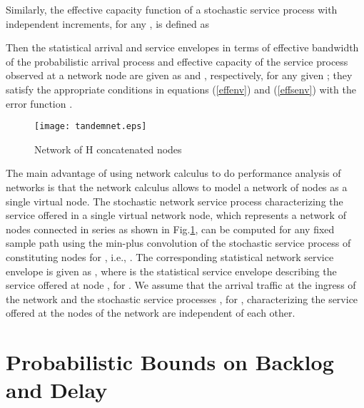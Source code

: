 \documentclass[letterpaper]{IEEEtran}
\begin{document}
Similarly, the effective capacity function of a stochastic service process  with independent increments, for any , is defined as
 
Then the statistical arrival and service envelopes in terms of effective bandwidth of the probabilistic arrival process and effective capacity of the service process observed at a network node are given as  and , respectively, for any given ; they satisfy the appropriate conditions in equations (\ref{effenv}) and (\ref{effsenv}) with the error function .
\begin{figure}
\centering
\texttt{[image: tandemnet.eps]}
\caption{ Network of H concatenated nodes}
\label{fig:tandemnet} \vspace{-5 mm}
\end{figure}
The main advantage of using network calculus to do performance analysis of networks is that the network calculus allows to model a network of nodes as a single virtual node. The stochastic network service process  characterizing the service offered in a single virtual network node, which represents a network of  nodes connected in series as shown in Fig.\ref{fig:tandemnet}, can be computed for any fixed sample path using the min-plus convolution of the stochastic service process  of constituting nodes for , i.e.,  \cite{chang:2000,fidler:2006}. The corresponding statistical network service envelope is given as , where  is the statistical service envelope describing the service offered at node , for . We assume that the arrival traffic  at the ingress of the network and the stochastic service processes , for , characterizing the service offered at the nodes of the network are independent of each other.

\section{Probabilistic Bounds on Backlog and Delay}
\label{sec:bounds}
\end{document}
